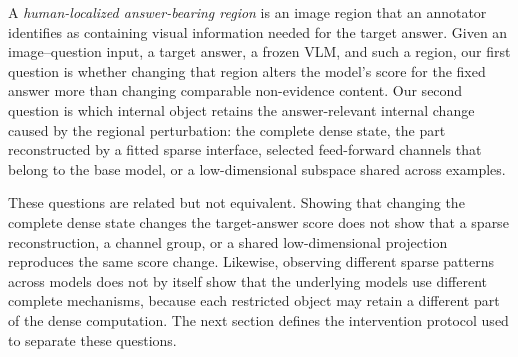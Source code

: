 A \emph{human-localized answer-bearing region} is an image region that an annotator identifies as containing visual information needed for the target answer. Given an image--question input, a target answer, a frozen VLM, and such a region, our first question is whether changing that region alters the model's score for the fixed answer more than changing comparable non-evidence content. Our second question is which internal object retains the answer-relevant internal change caused by the regional perturbation: the complete dense state, the part reconstructed by a fitted sparse interface, selected feed-forward channels that belong to the base model, or a low-dimensional subspace shared across examples.

These questions are related but not equivalent. Showing that changing the complete dense state changes the target-answer score does not show that a sparse reconstruction, a channel group, or a shared low-dimensional projection reproduces the same score change. Likewise, observing different sparse patterns across models does not by itself show that the underlying models use different complete mechanisms, because each restricted object may retain a different part of the dense computation. The next section defines the intervention protocol used to separate these questions.
